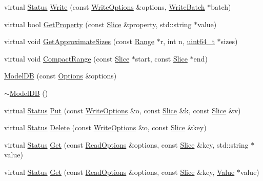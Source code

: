 \begin{DoxyCompactItemize}
\item 
virtual \hyperlink{classleveldb_1_1_status}{Status} \hyperlink{classleveldb_1_1_model_d_b_ae3a20d2fc971376349b142b9c2d159be}{Write} (const \hyperlink{structleveldb_1_1_write_options}{Write\+Options} \&options, \hyperlink{classleveldb_1_1_write_batch}{Write\+Batch} $\ast$batch)
\item 
virtual bool \hyperlink{classleveldb_1_1_model_d_b_a5c83a50a08e45c2564c39a650ea55b86}{Get\+Property} (const \hyperlink{classleveldb_1_1_slice}{Slice} \&property, std\+::string $\ast$value)
\item 
virtual void \hyperlink{classleveldb_1_1_model_d_b_aeb5502077fae602c5ca3c1153f29b693}{Get\+Approximate\+Sizes} (const \hyperlink{structleveldb_1_1_range}{Range} $\ast$r, int n, \hyperlink{stdint_8h_aaa5d1cd013383c889537491c3cfd9aad}{uint64\+\_\+t} $\ast$sizes)
\item 
virtual void \hyperlink{classleveldb_1_1_model_d_b_a7a04a6e5227079f861c26b920df6b833}{Compact\+Range} (const \hyperlink{classleveldb_1_1_slice}{Slice} $\ast$start, const \hyperlink{classleveldb_1_1_slice}{Slice} $\ast$end)
\item 
\hyperlink{classleveldb_1_1_model_d_b_ac0117ce964631ff7977b465de053a282}{Model\+D\+B} (const \hyperlink{structleveldb_1_1_options}{Options} \&options)
\item 
\hyperlink{classleveldb_1_1_model_d_b_a35e9042c7ed06e8324d5e40318771825}{$\sim$\+Model\+D\+B} ()
\item 
virtual \hyperlink{classleveldb_1_1_status}{Status} \hyperlink{classleveldb_1_1_model_d_b_a83d0ace11c8ff079f4e6eaa905744253}{Put} (const \hyperlink{structleveldb_1_1_write_options}{Write\+Options} \&o, const \hyperlink{classleveldb_1_1_slice}{Slice} \&k, const \hyperlink{classleveldb_1_1_slice}{Slice} \&v)
\item 
virtual \hyperlink{classleveldb_1_1_status}{Status} \hyperlink{classleveldb_1_1_model_d_b_a2c2690e07a206fd2197f592dd4478ff6}{Delete} (const \hyperlink{structleveldb_1_1_write_options}{Write\+Options} \&o, const \hyperlink{classleveldb_1_1_slice}{Slice} \&key)
\item 
virtual \hyperlink{classleveldb_1_1_status}{Status} \hyperlink{classleveldb_1_1_model_d_b_ab7744a74b5c0d2cd812dd87e83ca561b}{Get} (const \hyperlink{structleveldb_1_1_read_options}{Read\+Options} \&options, const \hyperlink{classleveldb_1_1_slice}{Slice} \&key, std\+::string $\ast$value)
\item 
virtual \hyperlink{classleveldb_1_1_status}{Status} \hyperlink{classleveldb_1_1_model_d_b_a79be5f1a06553112774459f94d893fe4}{Get} (const \hyperlink{structleveldb_1_1_read_options}{Read\+Options} \&options, const \hyperlink{classleveldb_1_1_slice}{Slice} \&key, \hyperlink{classleveldb_1_1_value}{Value} $\ast$value)

\end{DoxyCompactItemize}
